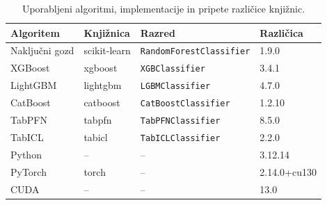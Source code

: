 \begin{table}[htbp]
\centering
\caption{Uporabljeni algoritmi, implementacije in pripete različice knjižnic.}
\label{tab:razlicice}
\begin{tabular}{llll}
\hline
Algoritem & Knjižnica & Razred & Različica \\
\hline
Naključni gozd & scikit-learn & \texttt{RandomForestClassifier} & 1.9.0 \\
XGBoost & xgboost & \texttt{XGBClassifier} & 3.4.1 \\
LightGBM & lightgbm & \texttt{LGBMClassifier} & 4.7.0 \\
CatBoost & catboost & \texttt{CatBoostClassifier} & 1.2.10 \\
TabPFN & tabpfn & \texttt{TabPFNClassifier} & 8.5.0 \\
TabICL & tabicl & \texttt{TabICLClassifier} & 2.2.0 \\
\hline
Python & -- & -- & 3.12.14 \\
PyTorch & torch & -- & 2.14.0+cu130 \\
CUDA & -- & -- & 13.0 \\
\hline
\end{tabular}
\end{table}
